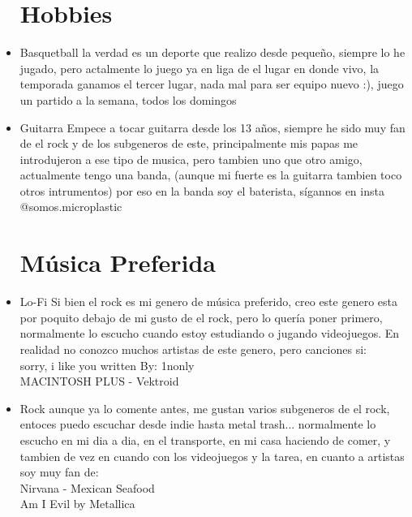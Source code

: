 \documentclass[12pt]{article}
\begin{document}
\begin{itemize}
   
   
\newpage

\section{Hobbies}
   \item {Basquetball}
   la verdad es un deporte que realizo desde pequeño, siempre lo he jugado, pero actalmente lo juego ya en liga de el lugar en donde vivo, la temporada ganamos el tercer lugar, nada mal para ser equipo nuevo :), juego un partido a la semana, todos los domingos
   \item{Guitarra}
   Empece a tocar guitarra desde los 13 años, siempre he sido muy fan de el rock y de los subgeneros de este, principalmente mis papas me introdujeron a ese tipo de musica, pero tambien uno que otro amigo, actualmente tengo una banda, (aunque mi fuerte es la guitarra tambien toco otros intrumentos) por eso en la banda soy el baterista, sígannos en insta @somos.microplastic
   
\section{Música Preferida}
   \item{Lo-Fi}
   Si bien el rock es mi genero de música preferido, creo este genero esta por poquito debajo de mi gusto de el rock, pero lo quería poner primero, normalmente lo escucho cuando estoy estudiando o jugando videojuegos. En realidad no conozco muchos artistas de este genero, pero canciones si:\\ sorry, i like you
   written By: 1nonly\\MACINTOSH PLUS - Vektroid
   \item{Rock}
   aunque ya lo comente antes, me gustan varios subgeneros de el rock, entoces puedo escuchar desde indie hasta metal trash... normalmente lo escucho en mi dia a dia, en el transporte, en mi casa haciendo de comer, y tambien de vez en cuando con los videojuegos y la tarea, en cuanto a artistas soy muy fan de:\\Nirvana - Mexican Seafood\\Am I Evil by Metallica
   
\end{itemize}
\end{document}
